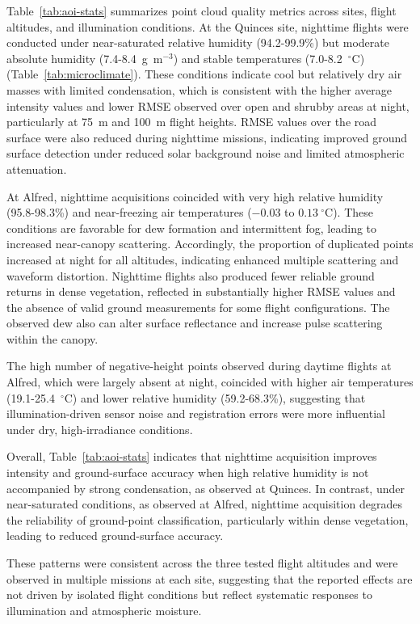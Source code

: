 \documentclass{isprs} %
\begin{document}
Table~\ref{tab:aoi-stats} summarizes point cloud quality metrics across sites, flight altitudes, and illumination conditions. At the Quinces site, nighttime flights were conducted under near-saturated relative humidity (94.2-99.9\%) but moderate absolute humidity (7.4-8.4~g~m$^{-3}$) and stable temperatures (7.0-8.2~$^\circ$C) (Table~\ref{tab:microclimate}). These conditions indicate cool but relatively dry air masses with limited condensation, which is consistent with the higher average intensity values and lower RMSE observed over open and shrubby areas at night, particularly at 75~m and 100~m flight heights. RMSE values over the road surface were also reduced during nighttime missions, indicating improved ground surface detection under reduced solar background noise and limited atmospheric attenuation.

At Alfred, nighttime acquisitions coincided with very high relative humidity (95.8-98.3\%) and near-freezing air temperatures ($-0.03$ to $0.13~^\circ$C). These conditions are favorable for dew formation and intermittent fog, leading to increased near-canopy scattering. Accordingly, the proportion of duplicated points increased at night for all altitudes, indicating enhanced multiple scattering and waveform distortion. Nighttime flights also produced fewer reliable ground returns in dense vegetation, reflected in substantially higher RMSE values and the absence of valid ground measurements for some flight configurations. The observed dew also can alter surface reflectance and increase pulse scattering within the canopy.

The high number of negative-height points observed during daytime flights at Alfred, which were largely absent at night, coincided with higher air temperatures (19.1-25.4~$^\circ$C) and lower relative humidity (59.2-68.3\%), suggesting that illumination-driven sensor noise and registration errors were more influential under dry, high-irradiance conditions.

Overall, Table~\ref{tab:aoi-stats} indicates that nighttime acquisition improves intensity and ground-surface accuracy when high relative humidity is not accompanied by strong condensation, as observed at Quinces. In contrast, under near-saturated conditions, as observed at Alfred, nighttime acquisition degrades the reliability of ground-point classification, particularly within dense vegetation, leading to reduced ground-surface accuracy.

These patterns were consistent across the three tested flight altitudes and were observed in multiple missions at each site, suggesting that the reported effects are not driven by isolated flight conditions but reflect systematic responses to illumination and atmospheric moisture.
\end{document}
